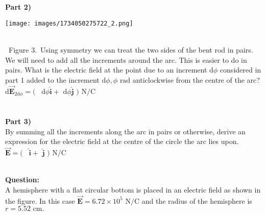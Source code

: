 \documentclass[addpoints,12pt, margin-left=35px]{exam}
\begin{document}
\\

 \\

\textbf{Part 2)}\\

\begin{center}
\texttt{[image: images/1734050275722\_2.png]}
\end{center}\\

 Figure 3. Using symmetry we can treat the two sides of the bent rod in pairs.\\

We will need to add all the increments around the arc. This is easier to do in pairs. What is the electric field at the point due to an increment $\mathrm{d} \phi$ considered in part 1 added to the increment $\mathrm{d} \phi, \phi \text{ rad}$ anticlockwise from the centre of the arc?\\

$\mathrm{d} \mathbf{\vec{E}}_{2 \mathrm{d} \phi} = ($  \underline{\hspace{3cm}}  $\mathrm{d} \phi \mathbf{\hat{i}} + $  \underline{\hspace{3cm}}  $\mathrm{d} \phi \mathbf{\hat{j}} \text{ ) N/C}$ \\

\\

 \\

\textbf{Part 3)}\\

By summing all the increments along the arc in pairs or otherwise, derive an expression for the electric field at the centre of the circle the arc lies upon.\\

$\mathbf{\vec{E}} = ($  \underline{\hspace{3cm}}  $ \mathbf{\hat{i}} + $  \underline{\hspace{3cm}}  $\mathbf{\hat{j}} \text{ ) N/C}$ \\

\\

\newpage

\textbf{Question:}\\

A hemisphere with a flat circular bottom is placed in an electric field as shown in the figure. In this case $\mathbf{\vec{E}} = {6.72 \times 10^{5}} \text{ N/C}$ and the radius of the hemisphere is $r = {5.52} \text{ cm.}$\\
\end{document}
